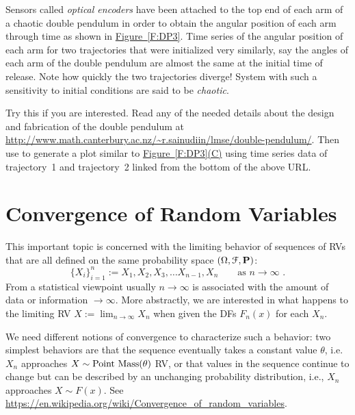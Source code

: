 Sensors called {\em optical encoders} have been attached to the top end of each arm of a chaotic double pendulum in order to obtain the angular position of each arm through time as shown in \hyperref[F:DP3]{Figure~\ref*{F:DP3}}.  Time series of the angular position of each arm for two trajectories that were initialized very similarly, say the angles of each arm of the double pendulum are almost the same at the initial time of release.  Note how quickly the two trajectories diverge!  System with such a sensitivity to initial conditions are said to be {\em chaotic}.

\begin{labwork}\label{LW:DPtrajectoryparsing}  Try this if you are interested.  Read any of the needed details about the design and fabrication of  the double pendulum at \href{http://www.math.canterbury.ac.nz/~r.sainudiin/lmse/double-pendulum/}{\url{http://www.math.canterbury.ac.nz/~r.sainudiin/lmse/double-pendulum/}}.  Then use \Matlab to generate a plot similar to \hyperref[F:DP3]{Figure~\ref*{F:DP3}(C)} using time series data of {\sf trajectory~1} and {\sf  trajectory~2} linked from the bottom of the above URL.
 \end{labwork}


\section{Convergence of Random Variables}\label{S:ConvOfRVs}
This important topic is concerned with the limiting behavior of sequences of RVs that are all defined on the same probability space $(\Omega,\mathcal{F},\mathbf{P})$:
\[
\{X_i \}_{i=1}^n := X_1,X_2,X_3, \ldots X_{n-1}, X_n \qquad \text{as  $n \rightarrow \infty$ .}
\]
From a statistical viewpoint usually $n \rightarrow \infty$ is associated with the amount of data or information $\rightarrow \infty$. 
More abstractly, we are interested in what happens to the limiting RV $X := \lim_{n\to \infty} X_n$ when given the DFs $F_n(x)$ for each $X_n$. 

We need different notions of convergence to characterize such a behavior: two simplest behaviors are that the sequence eventually takes a constant value $\theta$, 
i.e. $X_n$ approaches $X \sim \mbox{{\rm Point~Mass}}(\theta)$ RV, or that values in the sequence continue to change but can be described by an unchanging probability distribution, i.e., $X_n$ approaches $X \sim F(x)$. See \url{https://en.wikipedia.org/wiki/Convergence_of_random_variables}.


